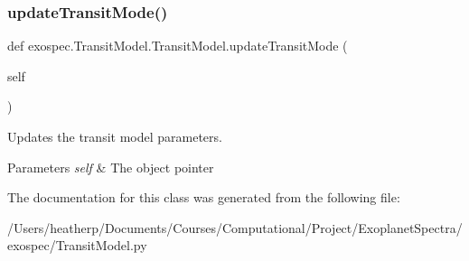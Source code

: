 \subsubsection{\texorpdfstring{update\+Transit\+Mode()}{updateTransitMode()}}
{\footnotesize\ttfamily def exospec.\+Transit\+Model.\+Transit\+Model.\+update\+Transit\+Mode (\begin{DoxyParamCaption}\item[{}]{self }\end{DoxyParamCaption})}



Updates the transit model parameters. 


\begin{DoxyParams}{Parameters}
{\em self} & The object pointer \\
\hline
\end{DoxyParams}


The documentation for this class was generated from the following file\+:\begin{DoxyCompactItemize}
\item 
/\+Users/heatherp/\+Documents/\+Courses/\+Computational/\+Project/\+Exoplanet\+Spectra/exospec/Transit\+Model.\+py\end{DoxyCompactItemize}
